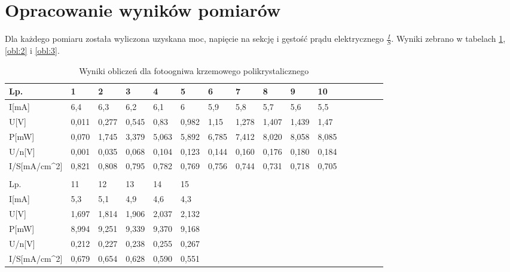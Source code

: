 \documentclass{article}
\begin{document}
\section{Opracowanie wyników pomiarów}
Dla każdego pomiaru została wyliczona uzyskana moc, napięcie na sekcję i gęstość prądu elektrycznego  $\frac{I}{S}$.
Wyniki zebrano w tabelach \ref{obl:1},\ref{obl:2} i \ref{obl:3}.
\begin{table}[H]
    \centering
    \begin{tabular}{|l|l|l|l|l|l|l|l|l|l|l|l|l|l|l|l|}
    \hline
        Lp. & 1 & 2 & 3 & 4 & 5 & 6 & 7 & 8 & 9 &10 \\ \hline   %
        I[mA] & 6,4 & 6,3 & 6,2 & 6,1 & 6 & 5,9 & 5,8 & 5,7 & 5,6 & 5,5 \\ \hline   %
        U[V] & 0,011 & 0,277 & 0,545 & 0,83 & 0,982 & 1,15 & 1,278 & 1,407 & 1,439 & 1,47\\ \hline 
         P[mW] & 0,070 & 1,745 & 3,379 & 5,063 & 5,892 & 6,785 & 7,412 & 8,020 & 8,058 & 8,085 \\ \hline
        U/n[V] & 0,001 & 0,035 & 0,068 & 0,104 & 0,123 & 0,144 & 0,160 & 0,176 & 0,180 & 0,184 \\ \hline
        I/S[mA/cm^2] & 0,821 & 0,808 & 0,795 & 0,782 & 0,769 & 0,756 & 0,744 & 0,731 & 0,718 & 0,705 \\ \hline
        \\ \hline %
         Lp.  & 11 & 12 & 13 & 14 & 15 & & &  & &  \\ \hline
        I[mA]  &5,3 & 5,1 & 4,9 & 4,6 & 4,3 & & & &  &  \\ \hline
        U[V]   & 1,697 & 1,814 & 1,906 & 2,037 & 2,132 & & & &  &   \\ \hline
         
         P[mW] &  8,994 & 9,251 & 9,339 & 9,370 & 9,168 &&&&&\\ \hline
        U/n[V] & 0,212 & 0,227 & 0,238 & 0,255 & 0,267 &&&&&\\ \hline
        I/S[mA/cm^2] & 0,679 & 0,654 & 0,628 & 0,590 & 0,551&&&&& \\ \hline

    \end{tabular}
    \caption{Wyniki obliczeń dla fotoogniwa krzemowego polikrystalicznego}
    \label{obl:1}
\end{table}
\end{document}
